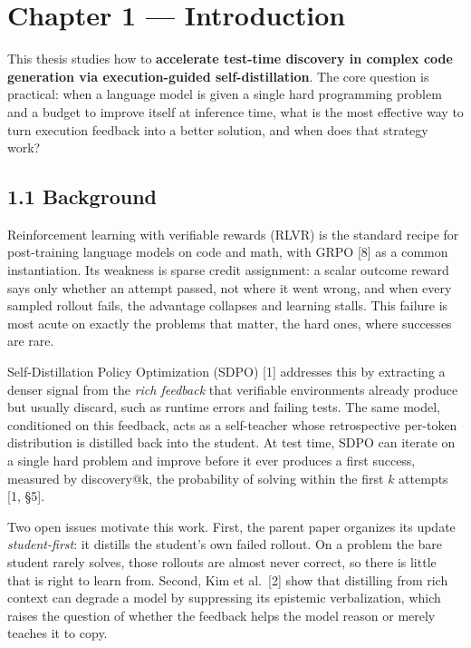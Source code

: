 \chapter{Chapter 1 --- Introduction}\label{chapter-1-introduction}

This thesis studies how to \textbf{accelerate test-time discovery in complex code generation via execution-guided self-distillation}. The core question is practical: when a language model is given a single hard programming problem and a budget to improve itself at inference time, what is the most effective way to turn execution feedback into a better solution, and when does that strategy work?

\section{1.1 Background}\label{background}

Reinforcement learning with verifiable rewards (RLVR) is the standard recipe for post-training language models on code and math, with GRPO {[}8{]} as a common instantiation. Its weakness is sparse credit assignment: a scalar outcome reward says only whether an attempt passed, not where it went wrong, and when every sampled rollout fails, the advantage collapses and learning stalls. This failure is most acute on exactly the problems that matter, the hard ones, where successes are rare.

Self-Distillation Policy Optimization (SDPO) {[}1{]} addresses this by extracting a denser signal from the \emph{rich feedback} that verifiable environments already produce but usually discard, such as runtime errors and failing tests. The same model, conditioned on this feedback, acts as a self-teacher whose retrospective per-token distribution is distilled back into the student. At test time, SDPO can iterate on a single hard problem and improve before it ever produces a first success, measured by discovery@k, the probability of solving within the first \(k\) attempts {[}1, §5{]}.

Two open issues motivate this work. First, the parent paper organizes its update \emph{student-first}: it distills the student's own failed rollout. On a problem the bare student rarely solves, those rollouts are almost never correct, so there is little that is right to learn from. Second, Kim et al.~{[}2{]} show that distilling from rich context can degrade a model by suppressing its epistemic verbalization, which raises the question of whether the feedback helps the model reason or merely teaches it to copy.

